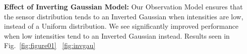 
\textbf{Effect of Inverting Gaussian Model:} Our Observation Model ensures that the sensor distribution tends to an Inverted Gaussian when intensities are low, instead of a Uniform distribution. We see significantly improved performance when low intensities tend to an Inverted Gaussian instead. Results seen in Fig.~\ref{fig:figure01} ~\ref{fig:invgau}

